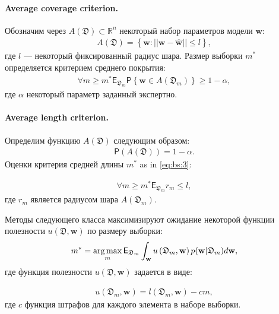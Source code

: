 \paragraph{Average coverage criterion.}
Обозначим через $A\left(\mathfrak{D}\right) \subset \mathbb{R}^n$ некоторый набор параметров модели $\textbf{w}$:
\[
\label{eq:bs:2}
\begin{aligned}
	A\left(\mathfrak{D}\right) = \left\{\textbf{w}:||\textbf{w} - \hat{\textbf{w}}||\leq l\right\},
\end{aligned}
\]
где $l$ --- некоторый фиксированный радиус шара.
Размер выборки $m^*$ определяется критерием среднего покрытия:
\[
\label{eq:bs:3}
\begin{aligned}
	\forall m \geq m^*    \mathsf{E}_{\mathfrak{D}_m}\mathsf{P}\left\{\textbf{w} \in A\left(\mathfrak{D}_m\right)\right\} \geq 1-\alpha,
\end{aligned}
\]
где $\alpha$ некоторый параметр заданный экспертно.
	
\paragraph{Average length criterion.}
Определим функцию $A\left(\mathfrak{D}\right)$ следующим образом:
\[
\label{eq:bs:4}
\begin{aligned}
	\mathsf{P}\left(A\left(\mathfrak{D}\right)\right) =  1- \alpha.
\end{aligned}
\]
Оценки критерия средней длины $m^*$ as in \eqref{eq:bs:3}:
	
\[
\label{eq:bs:5}
\begin{aligned}
	\forall m \geq m^*    \mathsf{E}_{\mathfrak{D}_m}r_m\leq l,
\end{aligned}
\]
где $r_m$ является радиусом шара $A\left(\mathfrak{D}_{m}\right)$.

Методы следующего класса максимизируют ожидание некоторой функции полезности $u\left(\mathfrak{D}, \textbf{w}\right)$ по размеру выборки:
\[
\label{eq:bs:6}
\begin{aligned}
	m^* = \operatorname*{arg\,max}_{m} \mathsf{E}_{\mathfrak{D}_m}\int_{\textbf{w}}u\left(\mathfrak{D}_m, \textbf{w}\right)p(\textbf{w}|\mathfrak{D}_m)d\textbf{w},
\end{aligned}
\]
где функция полезности $u\left(\mathfrak{D}, \textbf{w}\right)$ задается в виде:

\[
\label{eq:bs:7}
\begin{aligned}
	u\left(\mathfrak{D}_m, \textbf{w}\right) = l\left(\mathfrak{D}_m, \textbf{w}\right) - cm,
\end{aligned}
\]
 где $c$ функция штрафов для каждого элемента в наборе выборки.
	 
